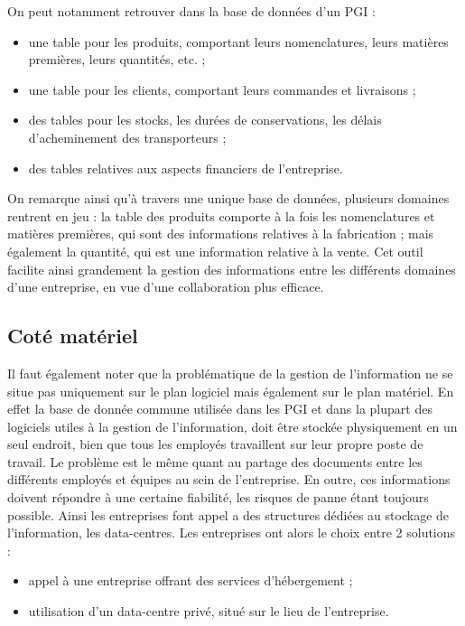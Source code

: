 On peut notamment retrouver dans la base de données d'un PGI :

\begin{itemize}
\item une table pour les produits, comportant leurs nomenclatures, leurs matières premières, leurs quantités, etc. ;
\item une table pour les clients, comportant leurs commandes et livraisons ;
\item des tables pour les stocks, les durées de conservations, les délais d'acheminement des transporteurs ;
\item des tables relatives aux aspects financiers de l'entreprise.
\end{itemize}

On remarque ainsi qu'à travers une unique base de données, plusieurs domaines rentrent en jeu : la table des produits comporte à la fois les nomenclatures et matières premières, qui sont des informations relatives à la fabrication ; mais également la quantité, qui est une information relative à la vente. Cet outil facilite ainsi grandement la gestion des informations entre les différents domaines d'une entreprise, en vue d'une collaboration plus efficace.

\subsection{Coté matériel}

Il faut également noter que la problématique de la gestion de l'information ne se situe pas uniquement sur le plan logiciel mais également sur le plan matériel. En effet la base de donnée commune utilisée dans les PGI et dans la plupart des logiciels utiles à la gestion de l'information, doit être stockée physiquement en un seul endroit, bien que tous les employés travaillent sur leur propre poste de travail. Le problème est le même quant au partage des documents entre les différents employés et équipes au sein de l'entreprise. En outre, ces informations doivent répondre à une certaine fiabilité, les risques de panne étant toujours possible. Ainsi les entreprises font appel a des structures dédiées au stockage de l'information, les data-centres. Les entreprises ont alors le choix entre 2 solutions :

\begin{itemize}
\item appel à une entreprise offrant des services d'hébergement ;
\item utilisation d'un data-centre privé, situé sur le lieu de l'entreprise.
\end{itemize}

